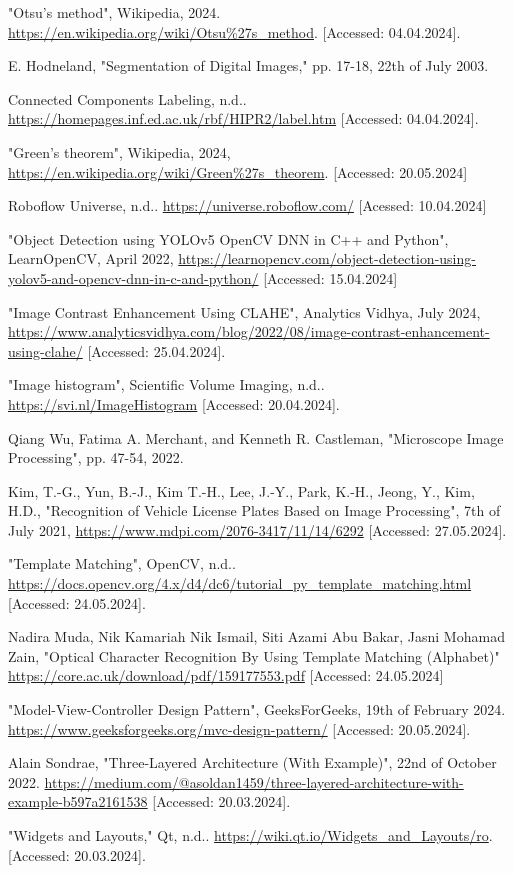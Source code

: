 \documentclass[12pt]{article}
\begin{document}
\begin{thebibliography}{9}
"Otsu's method", Wikipedia, 2024. \url{https://en.wikipedia.org/wiki/Otsu\%27s\_method}. [Accessed: 04.04.2024].

E. Hodneland, "Segmentation of Digital Images," pp. 17-18, 22th of July 2003. 

Connected Components Labeling, n.d.. \url{https://homepages.inf.ed.ac.uk/rbf/HIPR2/label.htm} [Accessed: 04.04.2024].

"Green's theorem", Wikipedia, 2024, \url{https://en.wikipedia.org/wiki/Green\%27s\_theorem}. [Accessed: 20.05.2024]

Roboflow Universe, n.d.. \url{https://universe.roboflow.com/} [Acessed: 10.04.2024]

"Object Detection using YOLOv5 OpenCV DNN in C++ and Python", LearnOpenCV, April 2022, \url{https://learnopencv.com/object-detection-using-yolov5-and-opencv-dnn-in-c-and-python/} [Accessed: 15.04.2024]

"Image Contrast Enhancement Using CLAHE", Analytics Vidhya, July 2024, \url{https://www.analyticsvidhya.com/blog/2022/08/image-contrast-enhancement-using-clahe/} [Accessed: 25.04.2024].

"Image histogram", Scientific Volume Imaging, n.d.. \url{https://svi.nl/ImageHistogram} [Accessed: 20.04.2024].

Qiang Wu, Fatima A. Merchant, and Kenneth R. Castleman, "Microscope Image Processing", pp. 47-54, 2022.

Kim, T.-G., Yun, B.-J., Kim T.-H., Lee, J.-Y., Park, K.-H., Jeong, Y., Kim, H.D., "Recognition of Vehicle License Plates Based on Image Processing", 7th of July 2021, \url{https://www.mdpi.com/2076-3417/11/14/6292} [Accessed: 27.05.2024].

"Template Matching", OpenCV, n.d.. \url{https://docs.opencv.org/4.x/d4/dc6/tutorial\_py\_template\_matching.html} [Accessed: 24.05.2024].

Nadira Muda, Nik Kamariah Nik Ismail, Siti Azami Abu Bakar, Jasni Mohamad Zain, "Optical Character Recognition By Using Template Matching (Alphabet)" \url{https://core.ac.uk/download/pdf/159177553.pdf} [Accessed: 24.05.2024]

"Model-View-Controller Design Pattern", GeeksForGeeks, 19th of February 2024. \url{https://www.geeksforgeeks.org/mvc-design-pattern/} [Accessed: 20.05.2024].

Alain Sondrae, "Three-Layered Architecture (With Example)", 22nd of October 2022. \url{https://medium.com/@asoldan1459/three-layered-architecture-with-example-b597a2161538} [Accessed: 20.03.2024].

"Widgets and Layouts," Qt, n.d.. \url{https://wiki.qt.io/Widgets\_and\_Layouts/ro}. [Accessed: 20.03.2024].

\end{thebibliography}
\end{document}

